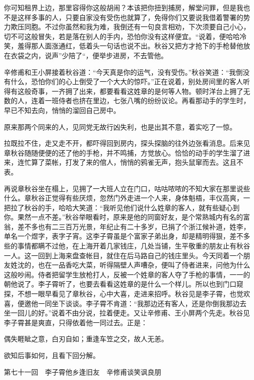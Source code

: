 \documentclass[12pt,UTF8]{ctexbook}
\begin{document}
{{{你可知租界上边，那里容得你这般胡闹？本该把你扭到捕房，解堂问罪，但是我也不是这样多事的人，只要自家没有受伤也就算了，免得你们又要说我借着警署的势力欺压同胞。不过你虽然和我为难，我倒还有一句良言相劝，下次须要自己小心，切不可这般冒失，若是落在别人的手内，恐怕你没有这样便宜。“说着，便哈哈冷笑，羞得那人面涨通红，低着头一句话也说不出。秋谷又把方才抢下的手枪替他放在衣袋之内，说声”少陪了“，便举步进房，不去管他。

辛修甫和王小屏接着秋谷道：“今天真是你的运气，没有受伤。”秋谷笑道：“我倒没有什么，恐怕你们的心上倒受了一个大大的惊吓。”正在说着，别处房间里的客人听得有这般奇事，一齐拥了出来，都要看看这姓章的是何等人物。顿时洋台上拥了无数的人，连着一班侍者也挤在里边，七张八嘴的纷纷议论。再看那动手的学生时，早已不知去向，悄悄的溜回自己房中。

原来那两个同来的人，见同党无故行凶失利，也是出其不意，着实吃了一惊。

拉既拉不住，走又走不开，都吓得回到房内，探头探脑的往外边张看消息。后来见章秋谷随随便便的还了他的手枪，并不鸣捕，方觉放心。恰恰的动手的学生溜了进来，连忙算了菜帐，打发了来的倌人，悄悄的鸦雀无声，抱头鼠窜而去。这且不表。

再说章秋谷坐在榻上，见拥了一大班人立在门口，咕咕哝哝的不知大家在那里说些什么。章秋谷正觉得有些厌烦，忽然门外走进一个人来，身体魁梧，丰仪高爽，一把拉了秋谷的手，哈哈大笑道：“我听见他们说什么姓章的客人，就有些疑心到你。果然一点不差。”秋谷举眼看时，原来是他的同窗好友，是个常熟城内有名的富翁，差不多也有二三百万光景，年纪止有二十多岁，已捐了个浙江候补道，姓李，单名一个煜字，表字子宵。这李子霄虽是个富家子弟出身，却是精明得狠，差不多些的事情都瞒不过他，在上海开着几家钱庄，几处当铺，生平敬重的朋友止有秋谷一人。这一回到上海来盘查帐目，就住在后马路自己的钱庄里头。今天同着一个朋友姓沈的，也在一品香吃大菜，听得隔壁人声嘈杂，便叫了侍者进来，问他为什么这般吵闹。侍者把留学生放枪打人，反被一个姓章的客人夺了手枪的事情，一一的朝他说了。李子霄听了，也要去看看这姓章的是什么一个样儿。所以也到门口窥探，不想一眼早看见了章秋谷，心中大喜，走进来招呼。秋谷见是李子霄，也觉欢喜，便邀他一同坐下谈谈。李子霄不肯道：“我那边还有客人，还是你倒我那边去坐一回儿的好。”说着不由分说，拉着便走。又让辛修甫、王小屏两个先走。秋谷见李子霄甚是爽直，只得依着他一同过去。正是：

偶失睚眦之意，白刃自如；重逢车笠之交，故人无恙。

欲知后事如何，且看下回分解。





第七十一回　李子霄他乡逢旧友　辛修甫谈笑讽良朋





}}}
\end{document}
